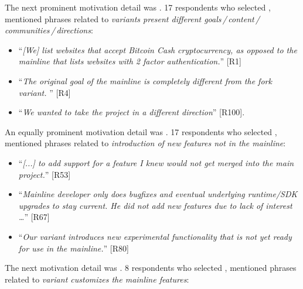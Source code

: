\nd The next prominent  motivation detail was . 17 respondents who selected , mentioned phrases related to \emph{variants present different goals\,/\,content\,/\,communities\,/\,directions}:

\begin{itemize}[leftmargin=*]
\item ``\emph{[We] %
list websites that accept Bitcoin Cash cryptocurrency, as opposed to the mainline that lists websites with 2 factor authentication.}'' [R1]
\item ``\emph{The original goal of the mainline is completely different from the fork variant. %
}'' [R4]
\item  ``\emph{We wanted to take the project in a different direction}'' [R100].
\end{itemize}

\nd An equally prominent  motivation detail was .
17 respondents who selected , mentioned phrases related to \emph{introduction of new features not in the mainline}:

\begin{itemize}[leftmargin=*]
\item ``\emph{[...] to add support for a feature I knew would not get merged into the main project.}'' [R53]
\item ``\emph{Mainline developer only does bugfixes and eventual underlying runtime/SDK upgrades to stay current. He did not add new features due to lack of interest \ldots}'' [R67]
\item ``\emph{Our variant introduces new experimental functionality that is not yet ready for use in the mainline.}'' [R80]
\end{itemize}

\nd The next  motivation detail was .
8 respondents who selected , mentioned phrases related to \emph{variant customizes the mainline features}:

